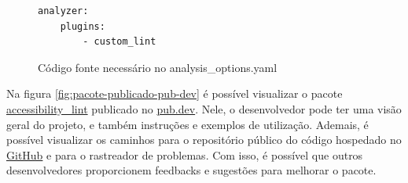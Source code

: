 \begin{figure}[!htbp]
\centering
\caption{Código fonte necessário no analysis\_options.yaml}\label{fig:analysis-options-yaml}
\begin{lstlisting}
analyzer:
	plugins:
		- custom_lint	
\end{lstlisting}
\vspace{2mm}
\end{figure}

\pagebreak

Na figura \ref{fig:pacote-publicado-pub-dev} é possível visualizar o pacote \href{https://pub.dev/packages/accessibility_lint}{accessibility\_lint} publicado no \href{https://pub.dev/}{pub.dev}. Nele, o desenvolvedor pode ter uma visão geral do projeto, e também instruções e exemplos de utilização. Ademais, é possível visualizar os caminhos para o repositório público do código hospedado no \href{https://github.com/MateuxLucax/accessibility-lint}{GitHub} e para o rastreador de problemas. Com isso, é possível que outros desenvolvedores proporcionem feedbacks e sugestões para melhorar o pacote.
